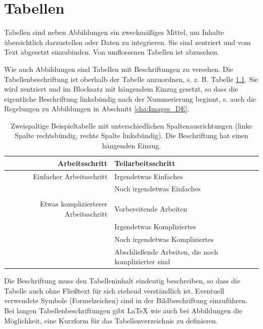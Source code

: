 \chapter{Tabellen}
\label{cha:Tabellen}

Tabellen sind neben Abbildungen ein zweckmäßiges Mittel, um Inhalte übersichtlich darzustellen oder Daten zu integrieren. Sie sind zentriert und vom Text abgesetzt einzubinden. Von umflossenen Tabellen ist abzusehen.

Wie auch Abbildungen sind Tabellen mit Beschriftungen zu versehen. Die Tabellenbeschriftung ist oberhalb der Tabelle anzuordnen, s. z. B. Tabelle \ref{tab:Beispieltab-1_DE}. Sie wird zentriert und im Blocksatz mit hängendem Einzug gesetzt, so dass die eigentliche Beschriftung linksbündig nach der Nummerierung beginnt, s. auch die Regelungen zu Abbildungen in Abschnitt \ref{cha:Images_DE}. 

\begin{table}[!htbp]
	\centering
	\caption[Zweispaltige Beispieltabelle mit unterschiedlichen Spaltenausrichtungen.]{Zweispaltige Beispieltabelle mit unterschiedlichen Spaltenausrichtungen (linke Spalte rechtsbündig, rechte Spalte linksbündig). Die Beschriftung hat einen hängenden Einzug.}
	\begin{tabular}{rl}
		\toprule
		\textbf{Arbeitsschritt} & \textbf{Teilarbeitsschritt} \\
		\midrule
		Einfacher Arbeitsschritt & Irgendetwas Einfaches \\
		& Noch irgendetwas Einfaches \\
		&\\
		Etwas komplizierterer Arbeitsschritt & Vorbereitende Arbeiten \\
		& Irgendetwas Kompliziertes \\
		& Noch irgendetwas Kompliziertes \\
		& Abschließende Arbeiten, die noch komplizierter sind \\
		\bottomrule
	\end{tabular}%
	\label{tab:Beispieltab-1_DE}%
\end{table}%

Die Beschriftung muss den Tabelleninhalt eindeutig beschreiben, so dass die Tabelle auch ohne Fließtext für sich stehend verständlich ist. Eventuell verwendete Symbole (Formelzeichen) sind in der Bildbeschriftung einzuführen. Bei langen Tabellenbeschriftungen gibt \LaTeX{} wie auch bei Abbildungen die Möglichkeit, eine Kurzform für das Tabellenverzeichnis zu definieren.

